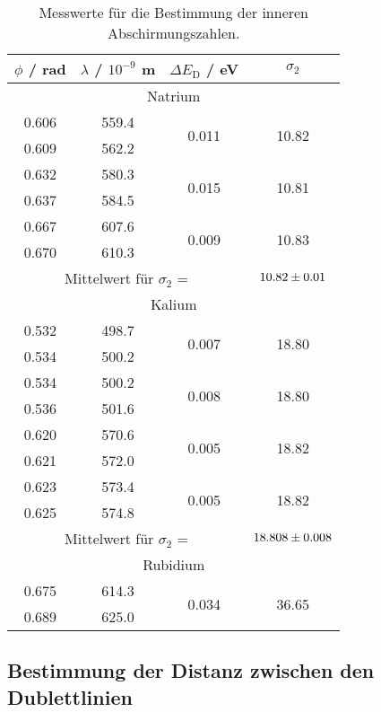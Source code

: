 \begin{table}[H]
  \centering
  \begin{tabular}{c|c|c|c}
    \hline
    $\phi$ / rad & $\lambda$ / $10^{-9}$ m & $\Delta E_\text{D}$ / eV & $\sigma_2$ \\
    \hline
    \multicolumn{4}{c}{Natrium} \\
    \hline
    0.606 & 559.4 & \multirow{2}{*}{0.011} & \multirow{2}{*}{10.82} \\
    0.609 & 562.2 & & \\
    \hline
    0.632 & 580.3 & \multirow{2}{*}{0.015} & \multirow{2}{*}{10.81} \\
    0.637 & 584.5 & & \\
    \hline
    0.667 & 607.6 & \multirow{2}{*}{0.009} & \multirow{2}{*}{10.83} \\
    0.670 & 610.3 & & \\
    \hline
    \multicolumn{3}{c}{Mittelwert für $\sigma_2$ =} & $\num{10.82 +- 0.01}$ \\
    \hline
    \multicolumn{4}{c}{Kalium} \\
    \hline
    0.532 & 498.7 & \multirow{2}{*}{0.007} & \multirow{2}{*}{18.80} \\
    0.534 & 500.2 & & \\
    \hline
    0.534 & 500.2 & \multirow{2}{*}{0.008} & \multirow{2}{*}{18.80} \\
    0.536 & 501.6 & & \\
    \hline
    0.620 & 570.6 & \multirow{2}{*}{0.005} & \multirow{2}{*}{18.82} \\
    0.621 & 572.0 & & \\
    \hline
    0.623 & 573.4 & \multirow{2}{*}{0.005} & \multirow{2}{*}{18.82} \\
    0.625 & 574.8 & & \\
    \hline
    \multicolumn{3}{c}{Mittelwert für $\sigma_2$ =} & $\num{18.808 +- 0.008}$ \\
    \hline
    \multicolumn{4}{c}{Rubidium} \\
    \hline
    0.675 & 614.3 & \multirow{2}{*}{0.034} & \multirow{2}{*}{36.65} \\
    0.689 & 625.0 & & \\
    \hline
  \end{tabular}
  \caption{Messwerte für die Bestimmung der inneren Abschirmungszahlen.}
  \label{tab:Mess3}
\end{table}

\subsection{Bestimmung der Distanz zwischen den Dublettlinien}
